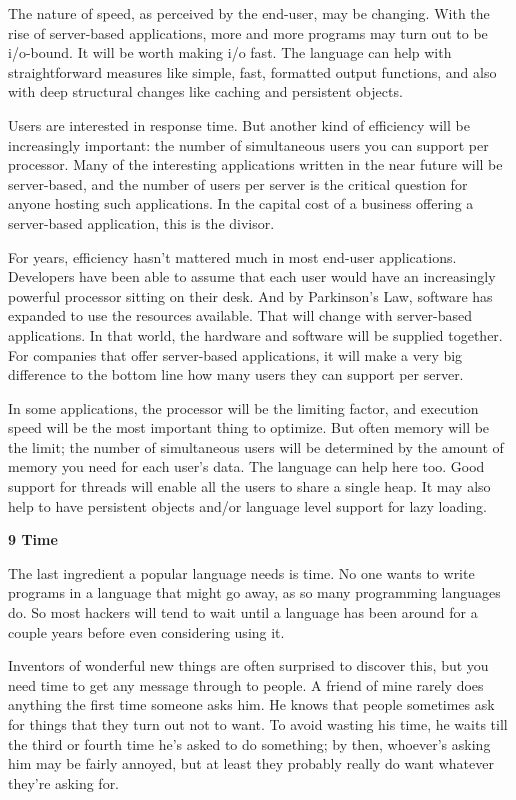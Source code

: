 \documentclass[12pt]{book}
\begin{document}
The nature of speed, as perceived by the end-user, may be changing. With
the rise of server-based applications, more and more programs may turn
out to be i/o-bound. It will be worth making i/o fast. The language can
help with straightforward measures like simple, fast, formatted output
functions, and also with deep structural changes like caching and
persistent objects.

Users are interested in response time. But another kind of efficiency
will be increasingly important: the number of simultaneous users you can
support per processor. Many of the interesting applications written in
the near future will be server-based, and the number of users per server
is the critical question for anyone hosting such applications. In the
capital cost of a business offering a server-based application, this is
the divisor.

For years, efficiency hasn't mattered much in most end-user
applications. Developers have been able to assume that each user would
have an increasingly powerful processor sitting on their desk. And by
Parkinson's Law, software has expanded to use the resources available.
That will change with server-based applications. In that world, the
hardware and software will be supplied together. For companies that
offer server-based applications, it will make a very big difference to
the bottom line how many users they can support per server.

In some applications, the processor will be the limiting factor, and
execution speed will be the most important thing to optimize. But often
memory will be the limit; the number of simultaneous users will be
determined by the amount of memory you need for each user's data. The
language can help here too. Good support for threads will enable all the
users to share a single heap. It may also help to have persistent
objects and/or language level support for lazy loading.

\textbf{9 Time}

The last ingredient a popular language needs is time. No one wants to
write programs in a language that might go away, as so many programming
languages do. So most hackers will tend to wait until a language has
been around for a couple years before even considering using it.

Inventors of wonderful new things are often surprised to discover this,
but you need time to get any message through to people. A friend of mine
rarely does anything the first time someone asks him. He knows that
people sometimes ask for things that they turn out not to want. To avoid
wasting his time, he waits till the third or fourth time he's asked to
do something; by then, whoever's asking him may be fairly annoyed, but
at least they probably really do want whatever they're asking for.
\end{document}
